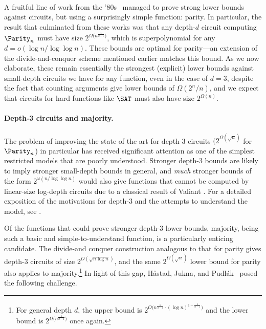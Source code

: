 \paragraph*{}

A fruitful line of work from the '80s~\cite{FSS81,Ajt83,Yao85,Has86} managed to prove strong lower bounds against  circuits, but using a surprisingly simple function: parity. In particular, the result that culminated from these works was that any depth-$d$ circuit computing $\Parity_n$ must have size $2^{\Omega\big(n^{\frac{1}{d-1}}\big)}$, which is superpolynomial for any $d = o(\log n/\log\log n)$. These bounds are optimal for parity---an extension of the divide-and-conquer scheme mentioned earlier matches this bound. As we now elaborate, these remain essentially  the strongest (explicit) lower bounds against small-depth circuits we have for any function, even in the case of $d=3$, despite the fact that counting arguments give lower bounds of $\Omega(2^n/n)$, and we expect that circuits for hard functions like $\SAT$ must also have size $2^{\Omega(n)}$. 

\paragraph*{Depth-3 circuits and majority.} The problem of improving the state of the art for depth-3 circuits $(2^{\Omega(\sqrt{n})}$ for $\Parity_n$) in particular has received significant attention as one of the simplest restricted models that are poorly understood. Stronger depth-3 bounds are likely to imply stronger small-depth bounds in general, and \emph{much} stronger bounds of the form $2^{\omega(n/\log\log n)}$ would also give functions that cannot be computed by linear-size log-depth circuits due to a classical result of Valiant \cite{Val83}. %
For a detailed exposition of the  motivations for depth-3 and the attempts to understand the model, see \cite[Chapter~11]{Juk12}.

Of the functions that could prove stronger depth-3 lower bounds, majority, being such a basic and simple-to-understand function, is a particularly enticing candidate.  The divide-and conquer construction analogous to that for parity gives depth-3 circuits of size $2^{O(\sqrt{n\log n})}$, and the same $2^{\Omega(\sqrt{n})}$ lower bound for parity also applies to majority.\footnote{For general depth $d$, the upper bound is $2^{O\big(n^{\frac{1}{d-1}}\cdot (\log n)^{1-\frac{1}{d-1}}\big)}$ \cite{KPPY84} and the lower bound is $2^{\Omega\big(n^{\frac{1}{d-1}}\big)}$ once again.} In light of this gap, H{\aa}stad, Jukna, and Pudl{\'a}k~\cite{HJP93} posed the following challenge.
 
